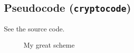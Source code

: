 \subsection{Pseudocode (\texttt{cryptocode})}
See the source code.
\begin{figure}[tbhp]
  \begin{center}
    \begin{tcolorbox}[width=10cm]
      \begin{pchstack}[center]
        \begin{pcvstack}
          \pcvspace
        \end{pcvstack}
        \pchspace[1em]
        \begin{pcvstack}
          \pcvspace
        \end{pcvstack}
      \end{pchstack}
    \end{tcolorbox}
  \end{center}
  \caption{My great scheme\label{fig:scheme}}  %
\end{figure}

\clearpage
